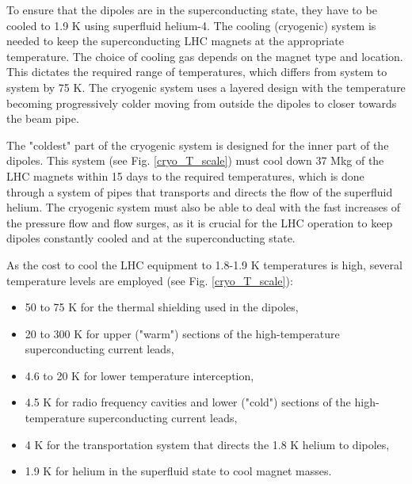 \begin{normalsize}
To ensure that the dipoles are in the superconducting state, they have to be cooled to 1.9 K using superfluid helium-4. The cooling (cryogenic) system is needed to keep the superconducting LHC magnets at the appropriate temperature. The choice of cooling gas depends on the magnet type and location. This dictates the required range of temperatures, which differs from system to system by 75 K. The cryogenic system uses a layered design with the temperature becoming progressively colder moving from outside the dipoles to closer towards the beam pipe. 

The "coldest" part of the cryogenic system is designed for the inner part of the dipoles. This system (see Fig. \ref{cryo_T_scale}) must cool down 37 Mkg of the LHC magnets within 15 days to the required temperatures, which is done through a system of pipes that transports and directs the flow of the superfluid helium. The cryogenic system must also be able to deal with the fast increases of the pressure flow and flow surges, as it is crucial for the LHC operation to keep dipoles constantly cooled and at the superconducting state.




As the cost to cool the LHC equipment to 1.8-1.9 K temperatures is high, several temperature levels are employed (see Fig. \ref{cryo_T_scale}):
 
\begin{itemize}
\item 50 to 75 K for the thermal shielding used in the dipoles,
\item 20 to 300 K for upper ("warm") sections of the high-temperature superconducting current leads,
\item 4.6 to 20 K for lower temperature interception,
\item 4.5 K for radio frequency cavities and lower ("cold") sections of the high-temperature superconducting current leads,
\item 4 K for the transportation system that directs the 1.8 K helium to dipoles,
\item 1.9 K for helium in the superfluid state to cool magnet masses.
\end{itemize}


\end{normalsize}
